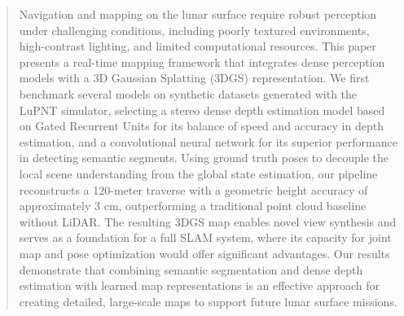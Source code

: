 \begin{abstract}
	Navigation and mapping on the lunar surface require robust perception under challenging conditions, including poorly textured environments, high-contrast lighting, and limited computational resources. This paper presents a real-time mapping framework that integrates dense perception models with a 3D Gaussian Splatting (3DGS) representation. We first benchmark several models on synthetic datasets generated with the LuPNT simulator, selecting a stereo dense depth estimation model based on Gated Recurrent Units for its balance of speed and accuracy in depth estimation, and a convolutional neural network for its superior performance in detecting semantic segments. Using ground truth poses to decouple the local scene understanding from the global state estimation, our pipeline reconstructs a 120-meter traverse with a geometric height accuracy of approximately 3 cm, outperforming a traditional point cloud baseline without LiDAR. The resulting 3DGS map enables novel view synthesis and serves as a foundation for a full SLAM system, where its capacity for joint map and pose optimization would offer significant advantages. Our results demonstrate that combining semantic segmentation and dense depth estimation with learned map representations is an effective approach for creating detailed, large-scale maps to support future lunar surface missions.
\end{abstract}
